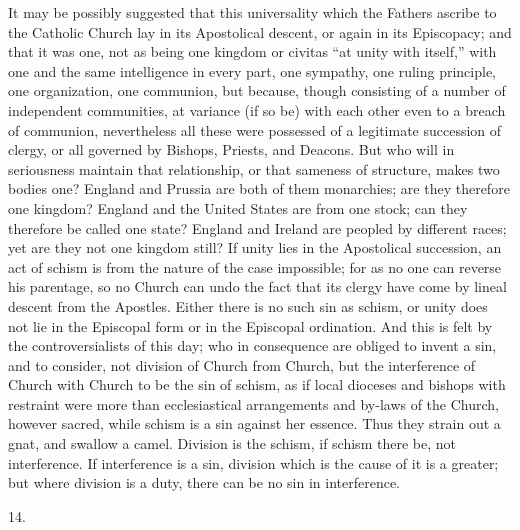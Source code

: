 It may be possibly suggested that this universality
which the Fathers ascribe to the Catholic Church lay in
its Apostolical descent, or again in its Episcopacy; and
that it was one, not as being one kingdom or civitas
``at unity with itself,'' with one and the same
intelligence in every part, one sympathy, one ruling
principle, one organization, one communion, but because,
though consisting of a number of independent communities,
at variance (if so be) with each other even to a breach
of communion, nevertheless all these were possessed of a
legitimate succession of clergy, or all governed by
Bishops, Priests, and Deacons. But who will in
seriousness maintain that relationship, or that sameness
of structure, makes two bodies one? England and Prussia
are both of them monarchies; are they therefore one
kingdom? England and the United States are from one
stock; can they therefore be called one state? England
and Ireland are peopled by different races; yet are they
not one kingdom still? If unity lies in the Apostolical
succession, an act of schism is from the nature of the
case impossible; for as no one can reverse his parentage,
so no Church can undo the fact that its clergy have come
by lineal descent from the Apostles. Either there is no
such sin as schism, or unity does not lie in the
Episcopal form or in the Episcopal ordination. And this
is felt by the controversialists of this day; who in
consequence are obliged to invent a sin, and to consider,
not division of Church from Church, but the interference
of Church with Church to be the sin of schism, as if
local dioceses and bishops with restraint were more than
ecclesiastical arrangements and by-laws of the Church,
however sacred, while schism is a sin against her
essence. Thus they strain out a gnat, and swallow a
camel. Division is the schism, if schism there be, not
interference. If interference is a sin, division which is
the cause of it is a greater; but where division is a
duty, there can be no sin in interference.

14.

